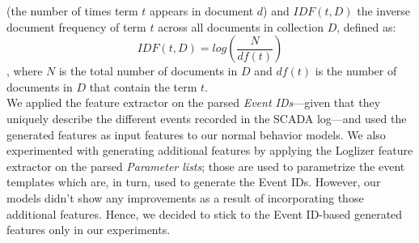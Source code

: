         (the number of times term $t$ appears in document $d$) and $IDF(t,D)$ the inverse document frequency of term $t$ across all documents in collection $D$, defined as:
        \begin{equation}
          IDF(t,D) = log(\frac{N}{df(t)})
        \end{equation}
        , where $N$ is the total number of documents in $D$ and $df(t)$ is the number of documents in $D$ that contain the term $t$.\\
        We applied the feature extractor on the parsed \emph{Event IDs}---given that they uniquely describe the different events recorded in the SCADA log---and 
        used the generated features as input features to our normal behavior models. We also experimented with generating additional features by applying the Loglizer feature extractor 
        on the parsed \emph{Parameter lists}; those are used to parametrize the event templates which are, in turn, used to generate the Event IDs. 
        However, our models didn't show any improvements as a result of incorporating those additional features. Hence, we decided to stick to the Event ID-based 
        generated features only in our experiments.



\clearpage

